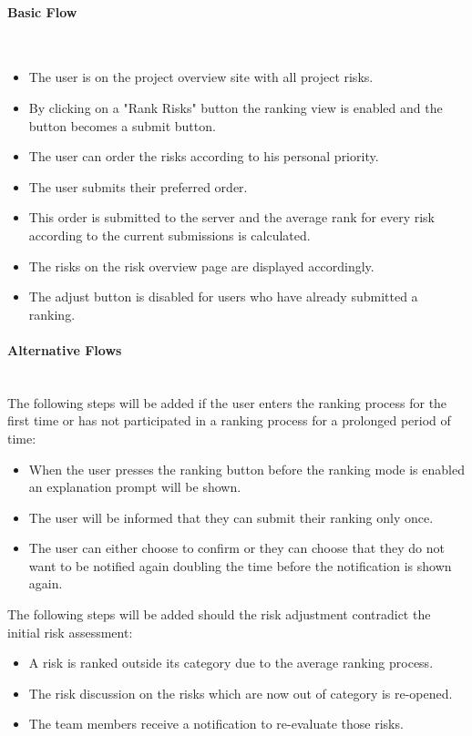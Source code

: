 \paragraph*{Basic Flow} \mbox{}\\
\begin{itemize}
	\vspace{-3mm}
	\setlength\itemsep{-1em}
	\item The user is on the project overview site with all project risks.
	\item By clicking on a "Rank Risks" button the ranking view is enabled and the button becomes a submit button.
	\item The user can order the risks according to his personal priority.
	\item The user submits their preferred order.
	\item This order is submitted to the server and the average rank for every risk according to the current submissions is calculated.
	\item The risks on the risk overview page are displayed accordingly.
	\item The adjust button is disabled for users who have already submitted a ranking.
\end{itemize}

\paragraph*{Alternative Flows}\mbox{}\\
The following steps will be added if the user enters the ranking process for the first time or has not participated in a ranking process for a prolonged period of time:
\begin{itemize}
	\vspace{-3mm}
	\setlength\itemsep{-1em}
	\item When the user presses the ranking button before the ranking mode is enabled an explanation prompt will be shown.
	\item The user will be informed that they can submit their ranking only once.
	\item The user can either choose to confirm or they can choose that they do not want to be notified again doubling the time before the notification is shown again.
\end{itemize}

The following steps will be added should the risk adjustment contradict the initial risk assessment:
\begin{itemize}
	\vspace{-3mm}
	\setlength\itemsep{-1em}
	\item A risk is ranked outside its category due to the average ranking process.
	\item The risk discussion on the risks which are now out of category is re-opened.
	\item The team members receive a notification to re-evaluate those risks.
\end{itemize}


